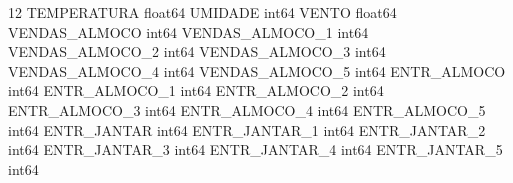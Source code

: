 \documentclass[	12pt, Times, openright, twoside, a4paper, english, brazil]{abntex2}
\begin{document}
        12	TEMPERATURA					float64 	UMIDADE						int64 	VENTO						float64 	VENDAS\_ALMOCO				int64 	VENDAS\_ALMOCO\_1				int64 	VENDAS\_ALMOCO\_2				int64 	VENDAS\_ALMOCO\_3				int64 	VENDAS\_ALMOCO\_4				int64 	VENDAS\_ALMOCO\_5				int64 	ENTR\_ALMOCO					int64 	ENTR\_ALMOCO\_1				int64 	ENTR\_ALMOCO\_2				int64 	ENTR\_ALMOCO\_3				int64 	ENTR\_ALMOCO\_4				int64 	ENTR\_ALMOCO\_5				int64 	ENTR\_JANTAR					int64 	ENTR\_JANTAR\_1				int64 	ENTR\_JANTAR\_2				int64 	ENTR\_JANTAR\_3				int64 	ENTR\_JANTAR\_4				int64 	ENTR\_JANTAR\_5				int64 \newline
        
	
\end{document}
